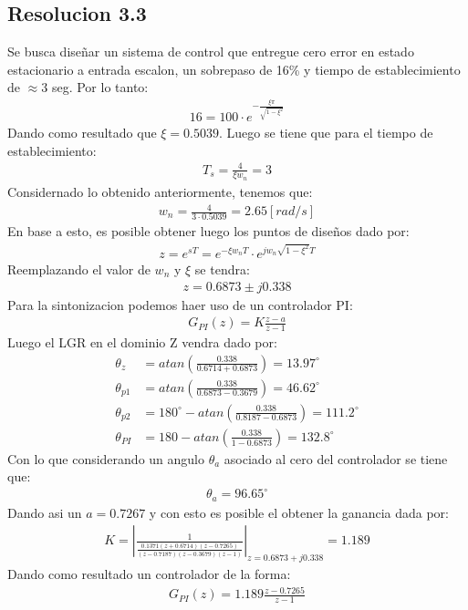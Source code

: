 \documentclass[
  11pt,
  letterpaper,
   addpoints,
  ]{exam}
\begin{document}
\begin{questions}
\begin{solution}
\subsection*{Resolucion 3.3}
Se busca diseñar un sistema de control que entregue cero error en estado estacionario a entrada escalon, un sobrepaso de 16\% y tiempo de establecimiento de \( \approx 3 \) seg. Por lo tanto:
\begin{align*}
    16 = 100 \cdot e^{-\frac{\xi \pi}{\sqrt{1-\xi^{2}}}}
\end{align*}
Dando como resultado que \( \xi = 0.5039 \). Luego se tiene que para el tiempo de establecimiento:
\begin{align*}
    T_{s} = \frac{4}{\xi w_{n}} = 3
\end{align*}
Considernado lo obtenido anteriormente, tenemos que:
\begin{align*}
    w_{n} = \frac{4}{3 \cdot 0.5039} = 2.65 [rad/s]
\end{align*}
En base a esto, es posible obtener luego los puntos de diseños dado por:
\begin{align*}
    z=e^{sT} = e^{-\xi w_{n}T} \cdot e^{jw_{n}\sqrt{1-\xi^{2}}T}
\end{align*}
Reemplazando el valor de $w_{n}$ y $\xi$ se tendra:
\begin{align*}
    z= 0.6873 \pm j0.338
\end{align*}
Para la sintonizacion podemos haer uso de un controlador PI: 
\begin{align}
    G_{PI}(z) = K\frac{z-a}{z-1}
\end{align}
Luego el LGR  en el dominio Z vendra dado por:
\begin{align}
    \theta_{z}&= atan\left(\frac{0.338}{0.6714+0.6873}\right) = 13.97^{\circ}\\
    \theta_{p1}& = atan\left(\frac{0.338}{0.6873-0.3679}\right) = 46.62^{\circ}\\
    \theta_{p2}& = 180^{\circ} - atan\left(\frac{0.338}{0.8187-0.6873}\right) = 111.2^{\circ}\\
    \theta_{PI}&= 180 - atan\left(\frac{0.338}{1-0.6873}\right) = 132.8^{\circ} 
\end{align}
Con lo que considerando un angulo $\theta_{a}$ asociado al cero del controlador se tiene que:
\begin{align*}
    \theta_{a} = 96.65^{\circ}
\end{align*}
Dando asi un $a =0.7267$ y con esto es posible el obtener la ganancia dada por:
\begin{align}
    K = \left| \frac{1}{\frac{0.1371(z+0.6714)(z-0.7265)}{(z-0.7187)(z-0.3679)(z-1)}}\right|_{z=0.6873 + j0.338} = 1.189
\end{align}
Dando como resultado un controlador de la forma:
\begin{align}
    G_{PI}(z) = 1.189\frac{z-0.7265}{z-1}
\end{align}
\end{solution}
\end{questions}
\newpage
\end{document}
